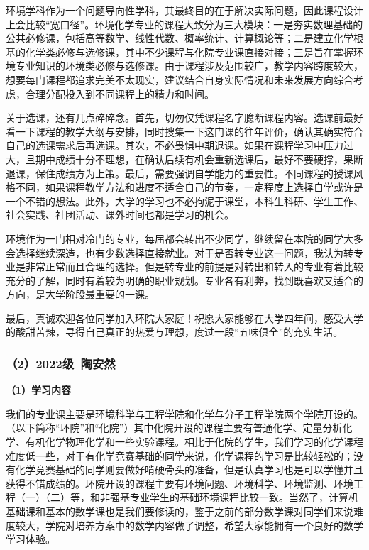 \vspace{10pt}

环境学科作为一个问题导向性学科，其最终目的在于解决实际问题，因此课程设计上会比较“宽口径”。环境化学专业的课程大致分为三大模块：一是夯实数理基础的公共必修课，包括高等数学、线性代数、概率统计、计算概论等；二是建立化学根基的化学类必修与选修课，其中不少课程与化院专业课直接对接；三是旨在掌握环境专业知识的环境类必修与选修课。由于课程涉及范围较广，教学内容跨度较大，想要每门课程都追求完美不太现实，建议结合自身实际情况和未来发展方向综合考虑，合理分配投入到不同课程上的精力和时间。

\vspace{10pt}

关于选课，还有几点碎碎念。首先，切勿仅凭课程名字臆断课程内容。选课前最好看一下课程的教学大纲与安排，同时搜集一下这门课的往年评价，确认其确实符合自己的选课需求后再选课。其次，不必畏惧中期退课。如果在课程学习中压力过大，且期中成绩十分不理想，在确认后续有机会重新选课后，最好不要硬撑，果断退课，保住成绩方为上策。最后，需要强调自学能力的重要性。不同课程的授课风格不同，如果课程教学方法和进度不适合自己的节奏，一定程度上选择自学或许是一个不错的想法。此外，大学的学习也不必拘泥于课堂，本科生科研、学生工作、社会实践、社团活动、课外时间也都是学习的机会。

\vspace{10pt}

环境作为一门相对冷门的专业，每届都会转出不少同学，继续留在本院的同学大多会选择继续深造，也有少数选择直接就业。对于是否转专业这一问题，我认为转专业是非常正常而且合理的选择。但是转专业的前提是对转出和转入的专业有着比较充分的了解，同时有着较为明确的职业规划。专业各有利弊，找到既喜欢又适合的方向，是大学阶段最重要的一课。

\vspace{10pt}

最后，真诚欢迎各位同学加入环院大家庭！祝愿大家能够在大学四年间，感受大学的酸甜苦辣，寻得自己真正的热爱与理想，度过一段“五味俱全”的充实生活。

\subsubsection{（2）2022级\ 陶安然}

\textbf{（1）学习内容}

我们的专业课主要是环境科学与工程学院和化学与分子工程学院两个学院开设的。（以下简称“环院”和“化院”）其中化院开设的课程主要有普通化学、定量分析化学、有机化学物理化学和一些实验课程。相比于化院的学生，我们学习的化学课程难度低一些，对于有化学竞赛基础的同学来说，化学课程的学习是比较轻松的；没有化学竞赛基础的同学则要做好啃硬骨头的准备，但是认真学习也是可以学懂并且获得不错成绩的。环院开设的课程主要有环境问题、环境科学、环境监测、环境工程（一）（二）等，和非强基专业学生的基础环境课程比较一致。当然了，计算机基础课和基本的数学课也是我们要修读的，鉴于之前的部分数学课对同学们来说难度较大，学院对培养方案中的数学内容做了调整，希望大家能拥有一个良好的数学学习体验。


